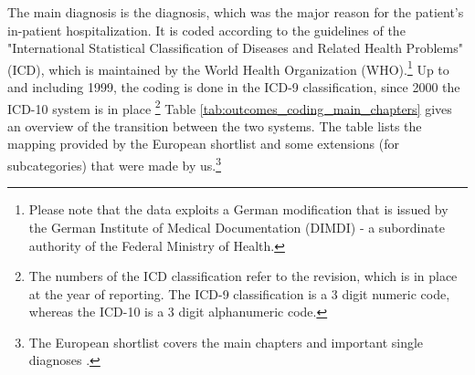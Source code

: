 \documentclass[11pt, a4paper]{article} %
\begin{document}
The main diagnosis is the diagnosis, which was the major reason for the patient's in-patient hospitalization. It is coded according to the guidelines of the "International Statistical Classification of Diseases and Related Health Problems" (ICD), which is maintained by the World Health Organization (WHO).\footnote{Please note that the data exploits a German modification that is issued by the German Institute of Medical Documentation (DIMDI) - a subordinate authority of the Federal Ministry of Health.} Up to and including 1999, the coding is done in the ICD-9 classification, since 2000 the ICD-10 system is in place \footnote{The numbers of the ICD classification refer to the revision, which is in place at the year of reporting. The ICD-9 classification is a 3 digit numeric code, whereas the ICD-10 is a 3 digit alphanumeric code.} Table \ref{tab:outcomes_coding_main_chapters} gives an overview of the transition between the two systems. The table lists the mapping provided by the European shortlist and some extensions (for subcategories) that were made by us.\footnote{The European shortlist covers the main chapters and important single diagnoses \citep[p. 76]{statistisches2012diagnosedaten}.}\newline
\end{document}
